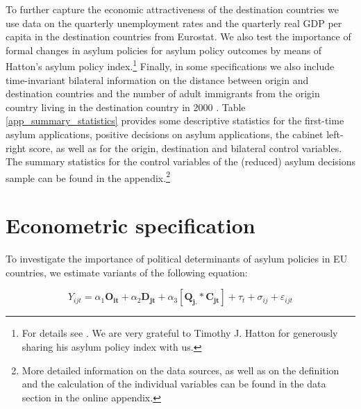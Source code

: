 \documentclass[a4paper,12pt]{article}
\begin{document}
To further capture the economic attractiveness of the destination countries we use data on the quarterly unemployment rates and the quarterly real GDP per capita in the destination countries from Eurostat. We also test the importance of formal changes in asylum policies for asylum policy outcomes by means of Hatton's asylum policy index.\footnote{For details see \citet{hatton2009}. We are very grateful to Timothy J. Hatton for generously sharing his asylum policy index with us.} Finally, in some specifications we also include time-invariant bilateral information on the distance between origin and destination countries \citep{distance2017} and the number of adult immigrants from the origin country living in the destination country in 2000 \citep{Artucc2015}. Table \ref{app_summary_statistics} provides some descriptive statistics for the first-time asylum applications, 
positive decisions on asylum applications,
the cabinet left-right score, as well as for the origin, destination and bilateral control variables. The summary statistics for the control variables of the (reduced) asylum decisions sample can be found in the appendix.\footnote{More detailed information on the data sources, as well as on the definition and the calculation of the individual variables can be found in the data section in the online appendix.}




\section{Econometric specification} \label{sec:econometric}

To investigate the importance of political determinants of asylum policies in EU countries, we estimate variants of the following equation:

\begin{equation}
Y_{ijt} =\alpha_1 \mathbf{O_{it}} + \alpha_2 \mathbf{D_{jt}} + \alpha_3 [\mathbf{Q_{j.}} *  \mathbf{C_{jt}}] + \tau_t + \sigma_{ij} +  \varepsilon_{ijt}
\end{equation}
\end{document}
